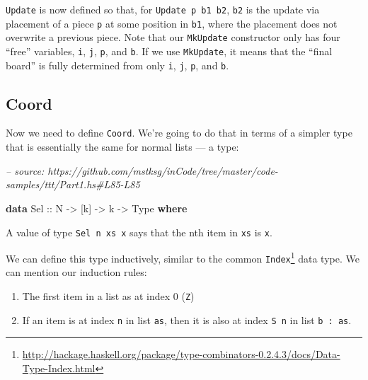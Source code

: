 \documentclass[]{article}
\newenvironment{Shaded}{}{}
\newcommand{\CommentTok}[1]{\textcolor[rgb]{0.38,0.63,0.69}{\textit{#1}}}
\newcommand{\DataTypeTok}[1]{\textcolor[rgb]{0.56,0.13,0.00}{#1}}
\newcommand{\KeywordTok}[1]{\textcolor[rgb]{0.00,0.44,0.13}{\textbf{#1}}}
\newcommand{\NormalTok}[1]{#1}
\newcommand{\OtherTok}[1]{\textcolor[rgb]{0.00,0.44,0.13}{#1}}
\renewcommand{\href}[2]{#2\footnote{\url{#1}}}
\begin{document}
\texttt{Update} is now defined so that, for \texttt{Update\ p\ b1\ b2},
\texttt{b2} is the update via placement of a piece \texttt{p} at some position
in \texttt{b1}, where the placement does not overwrite a previous piece. Note
that our \texttt{MkUpdate} constructor only has four ``free'' variables,
\texttt{i}, \texttt{j}, \texttt{p}, and \texttt{b}. If we use \texttt{MkUpdate},
it means that the ``final board'' is fully determined from only \texttt{i},
\texttt{j}, \texttt{p}, and \texttt{b}.

\hypertarget{coord}{%
\subsection{Coord}\label{coord}}

Now we need to define \texttt{Coord}. We're going to do that in terms of a
simpler type that is essentially the same for normal lists --- a type:

\begin{Shaded}
\begin{Highlighting}[]
\CommentTok{-- source: https://github.com/mstksg/inCode/tree/master/code-samples/ttt/Part1.hs#L85-L85}

\KeywordTok{data} \DataTypeTok{Sel}\OtherTok{ ::} \DataTypeTok{N} \OtherTok{->}\NormalTok{ [k] }\OtherTok{->}\NormalTok{ k }\OtherTok{->} \DataTypeTok{Type} \KeywordTok{where}
\end{Highlighting}
\end{Shaded}

A value of type \texttt{Sel\ n\ xs\ x} says that the nth item in \texttt{xs} is
\texttt{x}.

We can define this type inductively, similar to the common
\href{http://hackage.haskell.org/package/type-combinators-0.2.4.3/docs/Data-Type-Index.html}{\texttt{Index}}
data type. We can mention our induction rules:

\begin{enumerate}
\def\labelenumi{\arabic{enumi}.}
\tightlist
\item
  The first item in a list as at index 0 (\texttt{Z})
\item
  If an item is at index \texttt{n} in list \texttt{as}, then it is also at
  index \texttt{S\ n} in list \texttt{b\ \textquotesingle{}:\ as}.
\end{enumerate}
\end{document}
